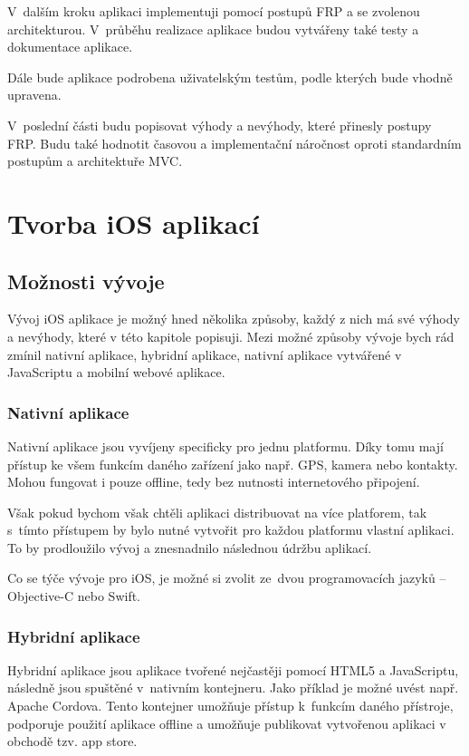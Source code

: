 \documentclass[thesis=M,czech]{FITthesis}[2012/06/26]
\begin{document}
V~dalším kroku aplikaci implementuji pomocí postupů FRP a se zvolenou architekturou. V~průběhu realizace aplikace budou vytvářeny také testy a dokumentace aplikace.

Dále bude aplikace podrobena uživatelským testům, podle kterých bude vhodně upravena.

V~poslední části budu popisovat výhody a nevýhody, které přinesly postupy FRP. Budu také hodnotit časovou a implementační náročnost oproti standardním postupům a architektuře MVC. 


\chapter{Tvorba iOS aplikací}

\section{Možnosti vývoje}
Vývoj iOS aplikace je možný hned několika způsoby, každý z nich má své výhody a nevýhody, které v této kapitole popisuji. Mezi možné způsoby vývoje bych rád zmínil nativní aplikace, hybridní aplikace, nativní aplikace vytvářené v JavaScriptu a mobilní webové aplikace.

\subsection{Nativní aplikace}
Nativní aplikace jsou vyvíjeny specificky pro jednu platformu. Díky tomu mají přístup ke všem funkcím daného zařízení jako např. GPS, kamera nebo kontakty. Mohou fungovat i pouze offline, tedy bez nutnosti internetového připojení. \cite{Nielsen}

Však pokud bychom však chtěli aplikaci distribuovat na více platforem, tak s~tímto přístupem by bylo nutné vytvořit pro každou platformu vlastní aplikaci. To by prodloužilo vývoj a znesnadnilo následnou údržbu aplikací.

Co se týče vývoje pro iOS, je možné si zvolit ze~dvou programovacích jazyků -- Objective-C nebo Swift. \cite{objc} \cite{swift}

\subsection{Hybridní aplikace}
Hybridní aplikace jsou aplikace tvořené nejčastěji pomocí HTML5 a JavaScriptu, následně jsou spuštěné v~nativním kontejneru. \cite{saleforce} Jako příklad je možné uvést např. Apache Cordova. Tento kontejner umožňuje přístup k~funkcím daného přístroje, podporuje použití aplikace offline a umožňuje publikovat vytvořenou aplikaci v obchodě tzv. app store. \cite{cordova}
\end{document}
